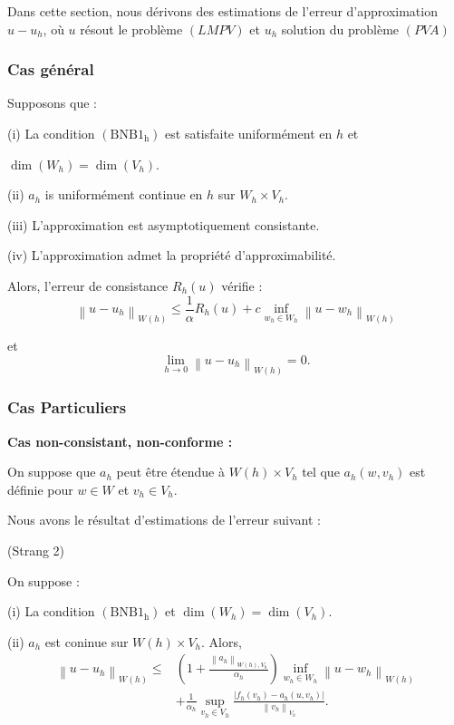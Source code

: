 Dans cette section, nous dérivons des estimations de l'erreur d'approximation $u-u_{h}$, où  $u$ résout le problème  $(LMPV)$ et  $u_{h}$ solution du  problème $(PVA)$


\subsubsection{Cas général }

Supposons que :


(i) La condition $\left(\mathrm{BNB} 1_{\mathrm{h}}\right)$ est satisfaite uniformément en  $h$ et 

 $\operatorname{dim}\left(W_{h}\right)=\operatorname{dim}\left(V_{h}\right)$.
 
 
(ii) $a_{h}$ is uniformément continue en  $h$  sur $W_{h} \times V_{h}$.


(iii) L'approximation est   asymptotiquement  consistante.

(iv) L'approximation admet la propriété  d'approximabilité.

Alors, l'erreur de consistance  $R_{h}(u)$ vérifie :
$$
\left\|u-u_{h}\right\|_{W(h)} \leq \frac{1}{\alpha} R_{h}(u)+c \inf _{w_{h} \in W_{h}}\left\|u-w_{h}\right\|_{W(h)}
$$

et  $$
\lim _{h \rightarrow 0}\left\|u-u_{h}\right\|_{W(h)}=0.
$$


\subsubsection{Cas Particuliers }

{\bf Cas non-consistant, non-conforme :}


 On suppose que $a_{h}$ peut être étendue à $W(h) \times V_{h}$ tel que   $a_{h}\left(w, v_{h}\right)$ est définie pour  $w \in W$  et  $v_{h} \in V_{h}$. 
 
 Nous avons le résultat d'estimations de l'erreur suivant :
\begin{proposition} (Strang 2)\
	
	 On suppose : 
	 
(i)  La condition $\left(\mathrm{BNB} 1_{\mathrm{h}}\right)$ et   $\operatorname{dim}\left(W_{h}\right)=\operatorname{dim}\left(V_{h}\right)$.

(ii) $a_{h}$ est coninue  sur $W(h) \times V_{h}$.
Alors, 
$$
\begin{aligned}
	\left\|u-u_{h}\right\|_{W(h)} \leq &\left(1+\frac{\left\|a_{h}\right\|_{W(h), V_{h}}}{\alpha_{h}}\right) \inf _{w_{h} \in W_{h}}\left\|u-w_{h}\right\|_{W(h)} \\
	&+\frac{1}{\alpha_{h}} \sup _{v_{h} \in V_{h}} \frac{\left|f_{h}\left(v_{h}\right)-a_{h}\left(u, v_{h}\right)\right|}{\left\|v_{h}\right\|_{V_{h}}}.
\end{aligned}
$$
\end{proposition}


